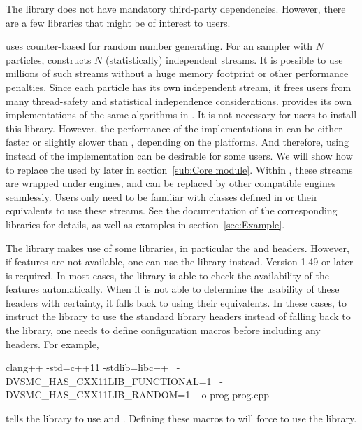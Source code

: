 \documentclass[11pt, bib, hyper, mint, minted=cache]{marticle}
\begin{document}
The library does not have mandatory third-party dependencies. However, there
are a few libraries that might be of interest to users.

\vsmc uses \frandom \parencite{random} counter-based \rng for random number
generating. For an \smc sampler with $N$ particles, \vsmc constructs $N$
(statistically) independent \rng streams. It is possible to use millions of
such streams without a huge memory footprint or other performance penalties.
Since each particle has its own independent \rng stream, it frees users from
many thread-safety and statistical independence considerations. \vsmc provides
its own implementations of the same algorithms in \parencite{random}. It is
not necessary for users to install this library. However, the performance of
the implementations in \vsmc can be either faster or slightly slower than
\lrandom, depending on the platforms. And therefore, using \lrandom instead of
the \vsmc implementation can be desirable for some users. We will show how to
replace the \rng used by \vsmc later in section~\ref{sub:Core module}. Within
\vsmc, these \rng streams are wrapped under \cppoo \rng engines, and can be
replaced by other compatible \rng engines seamlessly. Users only need to be
familiar with classes defined in \cppoo {} or their \fboost
equivalents to use these \rng streams. See the documentation of the
corresponding libraries for details, as well as examples in
section~\ref{sec:Example}.

The library makes use of some \cppoo libraries, in particular the
 and  headers. However, if \cppoo
features are not available, one can use the \lboost library instead. Version
1.49 or later is required. In most cases, the library is able to check the
availability of the \cppoo features automatically. When it is not able to
determine the usability of these \cppoo headers with certainty, it falls back
to using their \lboost equivalents. In these cases, to instruct the library to
use the standard library headers instead of falling back to the \lboost
library, one needs to define configuration macros before including any \vsmc
headers. For example,
\begin{shcode}
clang++ -std=c++11 -stdlib=libc++        \
        -DVSMC_HAS_CXX11LIB_FUNCTIONAL=1 \
        -DVSMC_HAS_CXX11LIB_RANDOM=1     \
        -o prog prog.cpp
\end{shcode}
tells the library to use \cppoo {} and
\cppinline{<random>}. Defining these macros to  will force \vsmc
to use the \lboost library.
\end{document}
